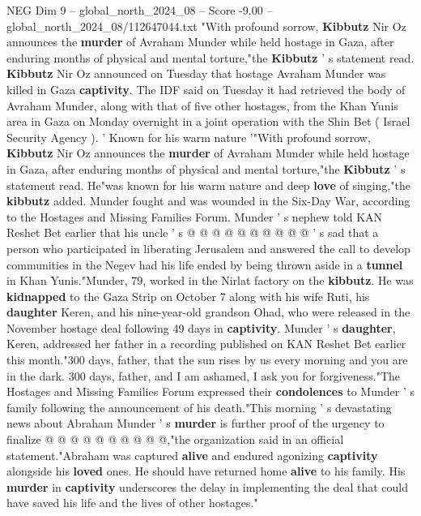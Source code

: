 \begin{textsample}{NEG Dim 9 – global\_north\_2024\_08 – Score -9.00 – global\_north\_2024\_08/112647044.txt}  \label{ex:f9_neg_083}
"With profound sorrow, \textbf{Kibbutz} Nir Oz announces the \textbf{murder} of Avraham Munder while held hostage in Gaza, after enduring months of physical and mental torture,"the \textbf{Kibbutz} ' s statement read. \textbf{Kibbutz} Nir Oz announced on Tuesday that hostage Avraham Munder was killed in Gaza \textbf{captivity}.
The IDF said on Tuesday it had retrieved the body of Avraham Munder, along with that of five other hostages, from the Khan Yunis area in Gaza on Monday overnight in a joint operation with the Shin Bet ( Israel Security Agency ). ' Known for his warm nature '"With profound sorrow, \textbf{Kibbutz} Nir Oz announces the \textbf{murder} of Avraham Munder while held hostage in Gaza, after enduring months of physical and mental torture,"the \textbf{Kibbutz} ' s statement read.
He"was known for his warm nature and deep \textbf{love} of singing,"the \textbf{kibbutz} added.
Munder fought and was wounded in the Six-Day War, according to the Hostages and Missing Families Forum.
Munder ' s nephew told KAN Reshet Bet earlier that his uncle ' s @ @ @ @ @ @ @ @ @ @ ' s sad that a person who participated in liberating Jerusalem and answered the call to develop communities in the Negev had his life ended by being thrown aside in a \textbf{tunnel} in Khan Yunis."Munder, 79, worked in the Nirlat factory on the \textbf{kibbutz}.
He was \textbf{kidnapped} to the Gaza Strip on October 7 along with his wife Ruti, his \textbf{daughter} Keren, and his nine-year-old grandson Ohad, who were released in the November hostage deal following 49 days in \textbf{captivity}.
Munder ' s \textbf{daughter}, Keren, addressed her father in a recording published on KAN Reshet Bet earlier this month."300 days, father, that the sun rises by us every morning and you are in the dark. 300 days, father, and I am ashamed, I ask you for forgiveness."The Hostages and Missing Families Forum expressed their \textbf{condolences} to Munder ' s family following the announcement of his death."This morning ' s devastating news about Abraham Munder ' s \textbf{murder} is further proof of the urgency to finalize @ @ @ @ @ @ @ @ @ @,"the organization said in an official statement."Abraham was captured \textbf{alive} and endured agonizing \textbf{captivity} alongside his \textbf{loved} ones.
He should have returned home \textbf{alive} to his family.
His \textbf{murder} in \textbf{captivity} underscores the delay in implementing the deal that could have saved his life and the lives of other hostages."

\end{textsample}
